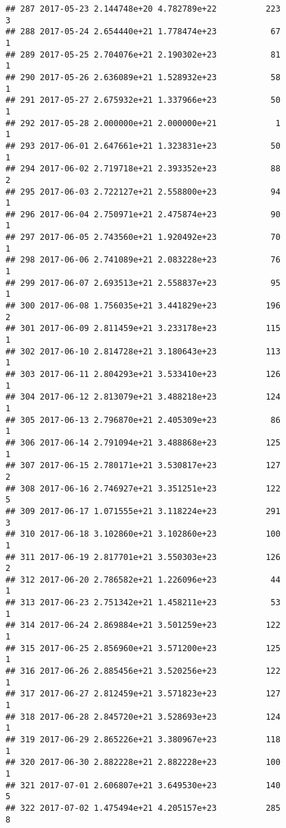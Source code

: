 \documentclass[]{article}
\begin{document}
\begin{verbatim}
## 287 2017-05-23 2.144748e+20 4.782789e+22          223               3
## 288 2017-05-24 2.654440e+21 1.778474e+23           67               1
## 289 2017-05-25 2.704076e+21 2.190302e+23           81               1
## 290 2017-05-26 2.636089e+21 1.528932e+23           58               1
## 291 2017-05-27 2.675932e+21 1.337966e+23           50               1
## 292 2017-05-28 2.000000e+21 2.000000e+21            1               1
## 293 2017-06-01 2.647661e+21 1.323831e+23           50               1
## 294 2017-06-02 2.719718e+21 2.393352e+23           88               2
## 295 2017-06-03 2.722127e+21 2.558800e+23           94               1
## 296 2017-06-04 2.750971e+21 2.475874e+23           90               1
## 297 2017-06-05 2.743560e+21 1.920492e+23           70               1
## 298 2017-06-06 2.741089e+21 2.083228e+23           76               1
## 299 2017-06-07 2.693513e+21 2.558837e+23           95               1
## 300 2017-06-08 1.756035e+21 3.441829e+23          196               2
## 301 2017-06-09 2.811459e+21 3.233178e+23          115               1
## 302 2017-06-10 2.814728e+21 3.180643e+23          113               1
## 303 2017-06-11 2.804293e+21 3.533410e+23          126               1
## 304 2017-06-12 2.813079e+21 3.488218e+23          124               1
## 305 2017-06-13 2.796870e+21 2.405309e+23           86               1
## 306 2017-06-14 2.791094e+21 3.488868e+23          125               1
## 307 2017-06-15 2.780171e+21 3.530817e+23          127               2
## 308 2017-06-16 2.746927e+21 3.351251e+23          122               5
## 309 2017-06-17 1.071555e+21 3.118224e+23          291               3
## 310 2017-06-18 3.102860e+21 3.102860e+23          100               1
## 311 2017-06-19 2.817701e+21 3.550303e+23          126               2
## 312 2017-06-20 2.786582e+21 1.226096e+23           44               1
## 313 2017-06-23 2.751342e+21 1.458211e+23           53               1
## 314 2017-06-24 2.869884e+21 3.501259e+23          122               1
## 315 2017-06-25 2.856960e+21 3.571200e+23          125               1
## 316 2017-06-26 2.885456e+21 3.520256e+23          122               1
## 317 2017-06-27 2.812459e+21 3.571823e+23          127               1
## 318 2017-06-28 2.845720e+21 3.528693e+23          124               1
## 319 2017-06-29 2.865226e+21 3.380967e+23          118               1
## 320 2017-06-30 2.882228e+21 2.882228e+23          100               1
## 321 2017-07-01 2.606807e+21 3.649530e+23          140               5
## 322 2017-07-02 1.475494e+21 4.205157e+23          285               8

\end{verbatim}
\end{document}
